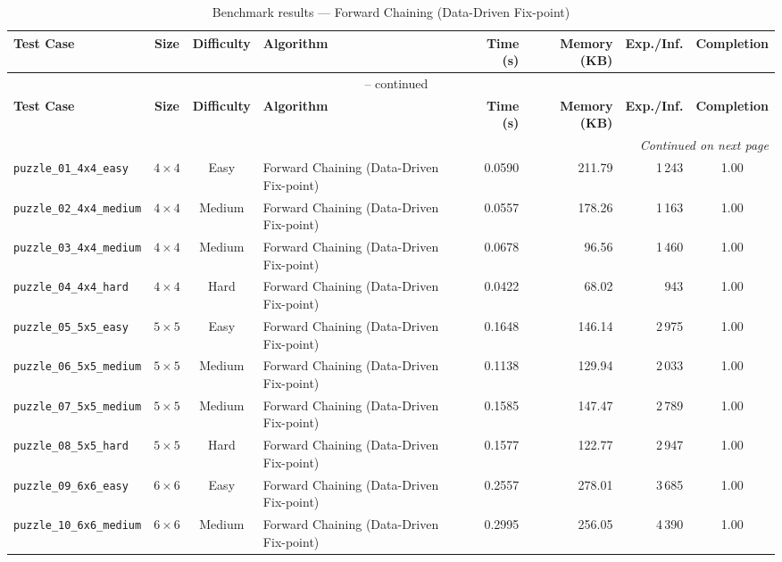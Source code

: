 \documentclass{article}
\begin{document}
\begin{longtable}{@{}lccl r r r c@{}}
  \caption{Benchmark results — Forward Chaining (Data-Driven Fix-point)} \label{tab:forward_chaining__data_driven_fix_point} \\
  \toprule
  \textbf{Test Case} & \textbf{Size} & \textbf{Difficulty} & \textbf{Algorithm} & \textbf{Time (s)} & \textbf{Memory (KB)} & \textbf{Exp./Inf.} & \textbf{Completion} \\
  \midrule
  \endfirsthead
  \multicolumn{8}{c}{\tablename\ \thetable{} -- continued} \\
  \toprule
  \textbf{Test Case} & \textbf{Size} & \textbf{Difficulty} & \textbf{Algorithm} & \textbf{Time (s)} & \textbf{Memory (KB)} & \textbf{Exp./Inf.} & \textbf{Completion} \\
  \midrule
  \endhead
  \midrule
  \multicolumn{8}{r}{\textit{Continued on next page}} \\
  \endfoot
  \bottomrule
  \endlastfoot
  \texttt{puzzle\_01\_4x4\_easy} & $4\times4$ & Easy & Forward Chaining (Data-Driven Fix-point) & 0.0590 & 211.79 & 1\,243 & 1.00 \\
  \texttt{puzzle\_02\_4x4\_medium} & $4\times4$ & Medium & Forward Chaining (Data-Driven Fix-point) & 0.0557 & 178.26 & 1\,163 & 1.00 \\
  \texttt{puzzle\_03\_4x4\_medium} & $4\times4$ & Medium & Forward Chaining (Data-Driven Fix-point) & 0.0678 & 96.56 & 1\,460 & 1.00 \\
  \texttt{puzzle\_04\_4x4\_hard} & $4\times4$ & Hard & Forward Chaining (Data-Driven Fix-point) & 0.0422 & 68.02 & 943 & 1.00 \\
  \texttt{puzzle\_05\_5x5\_easy} & $5\times5$ & Easy & Forward Chaining (Data-Driven Fix-point) & 0.1648 & 146.14 & 2\,975 & 1.00 \\
  \texttt{puzzle\_06\_5x5\_medium} & $5\times5$ & Medium & Forward Chaining (Data-Driven Fix-point) & 0.1138 & 129.94 & 2\,033 & 1.00 \\
  \texttt{puzzle\_07\_5x5\_medium} & $5\times5$ & Medium & Forward Chaining (Data-Driven Fix-point) & 0.1585 & 147.47 & 2\,789 & 1.00 \\
  \texttt{puzzle\_08\_5x5\_hard} & $5\times5$ & Hard & Forward Chaining (Data-Driven Fix-point) & 0.1577 & 122.77 & 2\,947 & 1.00 \\
  \texttt{puzzle\_09\_6x6\_easy} & $6\times6$ & Easy & Forward Chaining (Data-Driven Fix-point) & 0.2557 & 278.01 & 3\,685 & 1.00 \\
  \texttt{puzzle\_10\_6x6\_medium} & $6\times6$ & Medium & Forward Chaining (Data-Driven Fix-point) & 0.2995 & 256.05 & 4\,390 & 1.00 \\

\end{longtable}
\end{document}
